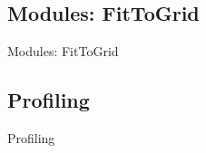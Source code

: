 \documentclass{beamer}
\begin{document}
\subsection{Modules: FitToGrid}
\begin{frame}{Modules: FitToGrid}
\end{frame}


\subsection{Profiling}
\begin{frame}{Profiling}
\end{frame}
\end{document}

